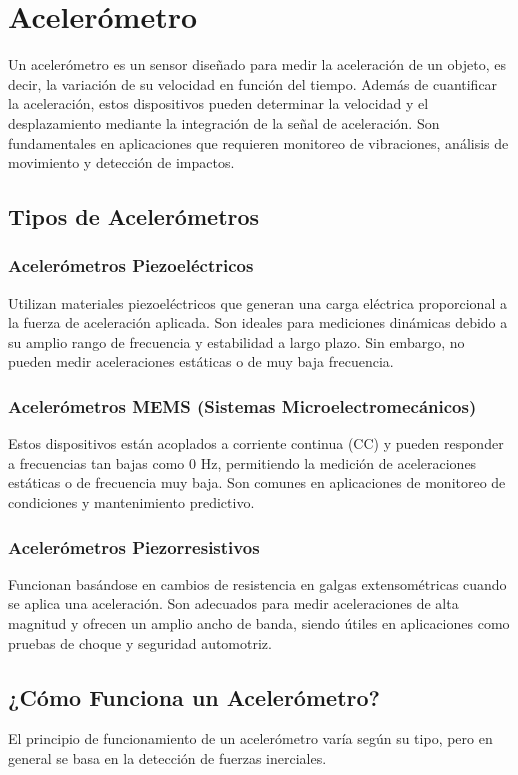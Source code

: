 	\section{\textbf{Acelerómetro}}
	Un acelerómetro es un sensor diseñado para medir la aceleración de un objeto, es decir, la variación de su velocidad en función del tiempo. Además de cuantificar la aceleración, estos dispositivos pueden determinar la velocidad y el desplazamiento mediante la integración de la señal de aceleración. Son fundamentales en aplicaciones que requieren monitoreo de vibraciones, análisis de movimiento y detección de impactos.
\subsection{\textbf{Tipos de Acelerómetros}}
\subsubsection{\textbf{Acelerómetros Piezoeléctricos}}
Utilizan materiales piezoeléctricos que generan una carga eléctrica proporcional a la fuerza de aceleración aplicada. Son ideales para mediciones dinámicas debido a su amplio rango de frecuencia y estabilidad a largo plazo. Sin embargo, no pueden medir aceleraciones estáticas o de muy baja frecuencia.

\subsubsection{\textbf{Acelerómetros MEMS (Sistemas Microelectromecánicos)}}
Estos dispositivos están acoplados a corriente continua (CC) y pueden responder a frecuencias tan bajas como 0 Hz, permitiendo la medición de aceleraciones estáticas o de frecuencia muy baja. Son comunes en aplicaciones de monitoreo de condiciones y mantenimiento predictivo.

\subsubsection{\textbf{Acelerómetros Piezorresistivos}}
Funcionan basándose en cambios de resistencia en galgas extensométricas cuando se aplica una aceleración. Son adecuados para medir aceleraciones de alta magnitud y ofrecen un amplio ancho de banda, siendo útiles en aplicaciones como pruebas de choque y seguridad automotriz.

\subsection{\textbf{¿Cómo Funciona un Acelerómetro?}}
El principio de funcionamiento de un acelerómetro varía según su tipo, pero en general se basa en la detección de fuerzas inerciales.  

